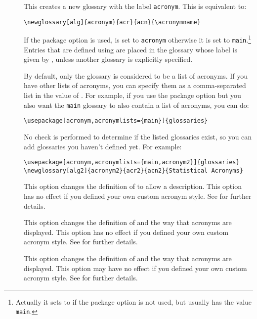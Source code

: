\documentclass{nlctdoc}
\begin{document}
\begin{description}
\item[] This creates a new glossary with the
label \texttt{acronym}. This is equivalent to:
\begin{verbatim}
\newglossary[alg]{acronym}{acr}{acn}{\acronymname}
\end{verbatim}
If the  package option is used, 
is set to \texttt{acronym} otherwise it is set to 
\texttt{main}.\footnote{Actually it sets  to
 if the  package option is
not used, but  usually has the value
\texttt{main}.} 
Entries that are defined using  are placed in
the glossary whose label is given by , unless
another glossary is explicitly specified.

\item[] By default, only the 
glossary is considered to be a list of acronyms. If you have other
lists of acronyms, you can specify them as a comma-separated list
in the value of . For example, if you use the
 package option but you also want the \texttt{main} 
glossary to also contain a list of acronyms, you can do:
\begin{verbatim}
\usepackage[acronym,acronymlists={main}]{glossaries}
\end{verbatim}
No check is performed to determine if the listed glossaries exist,
so you can add glossaries you haven't defined yet. For example:
\begin{verbatim}
\usepackage[acronym,acronymlists={main,acronym2}]{glossaries}
\newglossary[alg2]{acronym2}{acr2}{acn2}{Statistical Acronyms}
\end{verbatim}

\item[] This option changes the definition of
 to allow a description. This option has no effect if
you defined your own custom acronym style. See
 for further details.

\item[] This option changes the definition of
 and the way that acronyms are displayed. This
option has no effect if you defined your own custom acronym style. See
 for further details.

\item[] This option changes the definition of
 and the way that acronyms are displayed. This
option may have no effect if you defined your own custom acronym
style. See  for further details.


\end{description}
\end{document}
